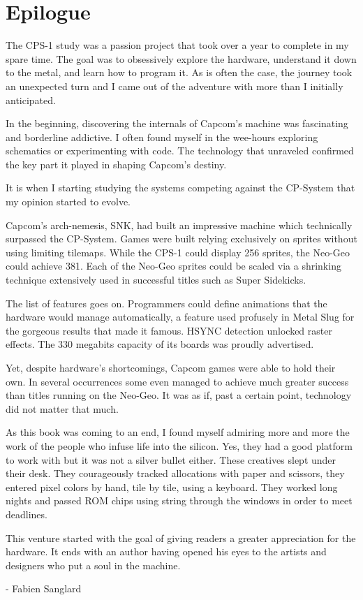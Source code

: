 \chapter{Epilogue} 

The CPS-1 study was a passion project that took over a year to complete in my spare time. The goal was to obsessively explore the hardware, understand it down to the metal, and learn how to program it. As is often the case, the journey took an unexpected turn and I came out of the adventure with more than I initially anticipated.

In the beginning, discovering the internals of Capcom's machine was fascinating and borderline addictive. I often found myself in the wee-hours exploring schematics or experimenting with code. The technology that unraveled confirmed the key part it played in shaping Capcom's destiny. 

It is when I starting studying the systems competing against the CP-System that my opinion started to evolve. 

Capcom's arch-nemesis, SNK, had built an impressive machine which technically surpassed the CP-System. Games were built relying exclusively on sprites without using limiting tilemaps. While the CPS-1 could display 256 sprites, the Neo-Geo could achieve 381. Each of the Neo-Geo sprites could be scaled via a shrinking technique extensively used in successful titles such as Super Sidekicks. 

The list of features goes on. Programmers could define animations that the hardware would manage automatically, a feature used profusely in Metal Slug for the gorgeous results that made it famous. HSYNC detection unlocked raster effects. The 330 megabits capacity of its boards was proudly advertised.

Yet, despite hardware's shortcomings, Capcom games were able to hold their own. In several occurrences some even managed to achieve much greater success than titles running on the Neo-Geo. It was as if, past a certain point, technology did not matter that much.

As this book was coming to an end, I found myself admiring more and more the work of the people who infuse life into the silicon. Yes, they had a good platform to work with but it was not a silver bullet either. These creatives slept under their desk. They courageously tracked allocations with paper and scissors, they entered pixel colors by hand, tile by tile, using a keyboard. They worked long nights and passed ROM chips using string through the windows in order to meet deadlines.

This venture started with the goal of giving readers a greater appreciation for the hardware. It ends with an author having opened his eyes to the artists and designers who put a soul in the machine.

- Fabien Sanglard
